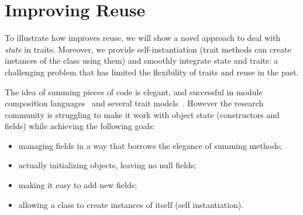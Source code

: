 \saveSpace\saveSpace\section{Improving Reuse}\saveSpace




To illustrate how \name improves reuse,
we will show a novel approach
to deal with \emph{state} in traits.
Moreover, we provide self-instantiation (trait methods can create instances of the class using them)
 and smoothly integrate state and traits: a challenging problem that has limited the flexibility of traits and
reuse in the past.

The idea of summing pieces of
code is elegant, and successful in module
composition languages~\cite{ancona2002calculus} and several trait
models~\cite{Traits:ECOOP2003,Bergel2007,BETTINI2013521,fjig}.  However the research
community is struggling to make it work with object state (constructors
and fields) while achieving the following goals:

\begin{itemize}
\item managing fields in a way that borrows the elegance of summing methods;
\item actually initializing objects, leaving no null fields;
\item making it easy to add new fields;
\item allowing a class to create instances of itself (self instantiation).
\end{itemize}

